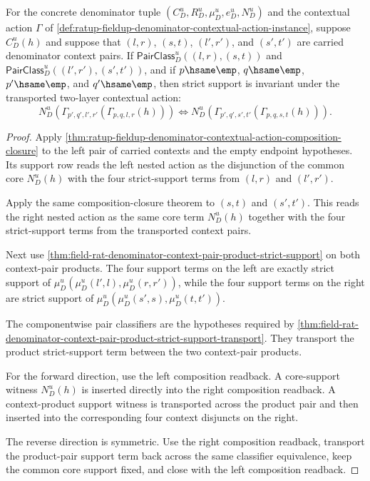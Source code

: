 \begin{theorem}
\label{thm:field-rat-denominator-contextual-action-pair-transport-support}
For the concrete denominator tuple
$(C_D^u,R_D^u,\mu_D^u,e_D^u,N_D^u)$ and the contextual action $\Gamma$ of
\autoref{def:ratup-fieldup-denominator-contextual-action-instance}, suppose
$C_D^u(h)$ and suppose that $(l,r)$, $(s,t)$, $(l',r')$, and $(s',t')$ are
carried denominator context pairs. If
$\mathsf{PairClass}_D^u((l,r),(s,t))$ and
$\mathsf{PairClass}_D^u((l',r'),(s',t'))$, and if
$p\hsame\emp$, $q\hsame\emp$, $p'\hsame\emp$, and $q'\hsame\emp$, then strict
support is invariant under the transported two-layer contextual action:
$$
N_D^u(\Gamma_{p',q',l',r'}(\Gamma_{p,q,l,r}(h)))
\Longleftrightarrow
N_D^u(\Gamma_{p',q',s',t'}(\Gamma_{p,q,s,t}(h))).
$$
\end{theorem}
\begin{proof}
Apply
\autoref{thm:ratup-fieldup-denominator-contextual-action-composition-closure}
to the left pair of carried contexts and the empty endpoint hypotheses. Its
support row reads the left nested action as the disjunction of the common core
$N_D^u(h)$ with the four strict-support terms from $(l,r)$ and $(l',r')$.

Apply the same composition-closure theorem to $(s,t)$ and $(s',t')$. This reads
the right nested action as the same core term $N_D^u(h)$ together with the four
strict-support terms from the transported context pairs.

Next use
\autoref{thm:field-rat-denominator-context-pair-product-strict-support} on both
context-pair products. The four support terms on the left are exactly strict
support of $\mu_D^u(\mu_D^u(l',l),\mu_D^u(r,r'))$, while the four support terms
on the right are strict support of
$\mu_D^u(\mu_D^u(s',s),\mu_D^u(t,t'))$.

The componentwise pair classifiers are the hypotheses required by
\autoref{thm:field-rat-denominator-context-pair-product-strict-support-transport}.
They transport the product strict-support term between the two context-pair
products.

For the forward direction, use the left composition readback. A core-support
witness $N_D^u(h)$ is inserted directly into the right composition readback. A
context-product support witness is transported across the product pair and then
inserted into the corresponding four context disjuncts on the right.

The reverse direction is symmetric. Use the right composition readback, transport
the product-pair support term back across the same classifier equivalence, keep
the common core support fixed, and close with the left composition readback.
\end{proof}

